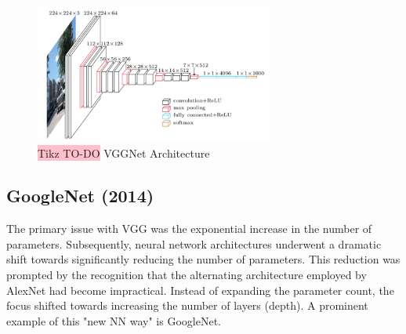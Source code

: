 \begin{figure}[!htbp]
    \centering
    \includegraphics[width=0.7\textwidth]{tikz/chapter5 - VGGNet.png}
    \caption{{\color{red}\colorbox{pink}{Tikz TO-DO}} VGGNet Architecture}
\end{figure}

\subsection{GoogleNet (2014)}
The primary issue with VGG was the exponential increase in the number of parameters. Subsequently, neural network architectures underwent a dramatic shift towards significantly reducing the number of parameters. This reduction was prompted by the recognition that the alternating architecture employed by AlexNet had become impractical. Instead of expanding the parameter count, the focus shifted towards increasing the number of layers (depth). A prominent example of this "new NN way" is GoogleNet.

